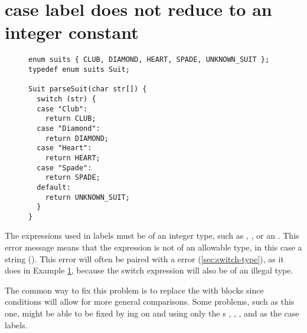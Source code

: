 \section{case label does not reduce to an integer constant}\label{sec:case-type}

\begin{figure}[htb]
\begin{lstlisting}
enum suits { CLUB, DIAMOND, HEART, SPADE, UNKNOWN_SUIT };
typedef enum suits Suit;

Suit parseSuit(char str[]) {
  switch (str) {
  case "Club":
    return CLUB;
  case "Diamond":
    return DIAMOND;
  case "Heart":
    return HEART;
  case "Spade":
    return SPADE;
  default:
    return UNKNOWN_SUIT;
  }
}
\end{lstlisting}
\label{ex:case-type}
\end{figure}

The expressions used in  labels must be of an integer type, such as , , or an .
This error message means that the expression is not of an allowable type, in this case a string ().
This error will often be paired with a  error (\ref{sec:switch-type}), as it does in Example \ref{ex:case-type}, because the switch expression will also be of an illegal type.

The common way to fix this problem is to replace the  with  blocks since  conditions will allow for more general comparisons.
Some problems, such as this one, might be able to be fixed by ing on  and using only the s , , , and  as the case labels.
\newpage